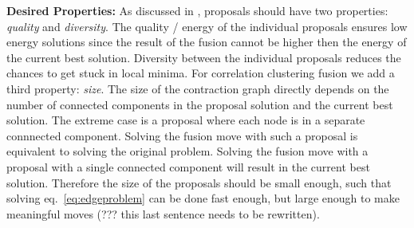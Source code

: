 \documentclass[10pt,twocolumn,letterpaper]{article}
\DeclareMathOperator*{\argmin}{arg\,min}
\DeclareMathOperator*{\argmax}{arg\,max}
\begin{document}
\noindent \textbf{Desired Properties:}
As discussed in \cite{Lempitsky-2010}, proposals
should have two properties: \emph{quality} 
and \emph{diversity}.
The quality / energy of the individual proposals
ensures low energy solutions since the
result of the fusion cannot be higher then
the energy of the current best solution.
Diversity between the individual proposals
reduces the chances to get stuck in local minima.
For correlation clustering fusion we add a third
property: \emph{size}.
The size of the contraction graph directly
depends on the number of connected components
in the proposal solution and the current best solution.
The extreme  case is a proposal where each 
node is in a separate connnected component.
Solving the fusion move with such a proposal
is equivalent to solving the original problem.
Solving the fusion move with a proposal with 
a single connected component will result 
in the current best solution.
Therefore the size of the proposals
should be small enough, such that solving
eq.~\ref{eq:edgeproblem} can
be done fast enough, but large enough to make
meaningful moves (??? this last sentence needs to be rewritten).




%
\end{document}
